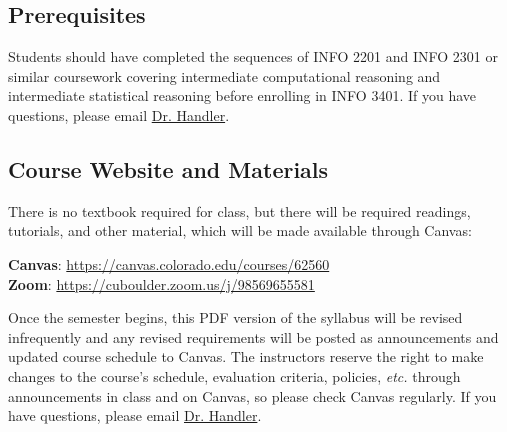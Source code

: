 \documentclass[10pt]{memoir}
\makeatletter
\def\mycourselisting{INFO 3401}
\def\myzoomurl{https://cuboulder.zoom.us/j/98569655581}
\def\mycanvasurl{https://canvas.colorado.edu/courses/62560}
\def\instructorAlastname{Handler}
\def\instructorAemail{abe.handler@colorado.edu}
\makeatother
\begin{document}
\subsection{Prerequisites}
Students should have completed the sequences of INFO 2201 and INFO 2301 or similar coursework covering intermediate computational reasoning and intermediate statistical reasoning before enrolling in \mycourselisting. If you have questions, please email \href{mailto:\instructorAemail}{Dr. \instructorAlastname}.


\subsection{Course Website and Materials}
There is no textbook required for class, but there will be required readings, tutorials, and other material, which will be made available through Canvas:
\vspace{-8pt}
    \begin{center}
    \Large{\textbf{Canvas}: \href{\mycanvasurl}{\mycanvasurl}}\\
    \Large{\textbf{Zoom}: \href{\myzoomurl}{\myzoomurl}}
    \end{center}
\vspace{-8pt}
Once the semester begins, this PDF version of the syllabus will be revised infrequently and any revised requirements will be posted as announcements and updated course schedule to Canvas. The instructors reserve the right to make changes to the course's schedule, evaluation criteria, policies, \textit{etc.} through announcements in class and on Canvas, so please check Canvas regularly. If you have questions, please email \href{mailto:\instructorAemail}{Dr. \instructorAlastname}.

\end{document}
